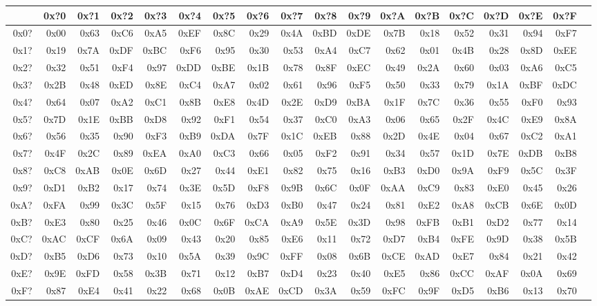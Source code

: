 \begin{table}[h]
{\ttfamily
\begin{tabular}{|r||r|r|r|r|r|r|r|r|r|r|r|r|r|r|r|r|r|}
\hline
 & 0x?0 & 0x?1 & 0x?2 & 0x?3 & 0x?4 & 0x?5 & 0x?6 & 0x?7 & 0x?8 & 0x?9 & 0x?A & 0x?B & 0x?C & 0x?D & 0x?E & 0x?F \\
\hline
0x0? & 0x00 & 0x63 & 0xC6 & 0xA5 & 0xEF & 0x8C & 0x29 & 0x4A & 0xBD & 0xDE & 0x7B & 0x18 & 0x52 & 0x31 & 0x94 & 0xF7 \\
0x1? & 0x19 & 0x7A & 0xDF & 0xBC & 0xF6 & 0x95 & 0x30 & 0x53 & 0xA4 & 0xC7 & 0x62 & 0x01 & 0x4B & 0x28 & 0x8D & 0xEE \\
0x2? & 0x32 & 0x51 & 0xF4 & 0x97 & 0xDD & 0xBE & 0x1B & 0x78 & 0x8F & 0xEC & 0x49 & 0x2A & 0x60 & 0x03 & 0xA6 & 0xC5 \\
0x3? & 0x2B & 0x48 & 0xED & 0x8E & 0xC4 & 0xA7 & 0x02 & 0x61 & 0x96 & 0xF5 & 0x50 & 0x33 & 0x79 & 0x1A & 0xBF & 0xDC \\
0x4? & 0x64 & 0x07 & 0xA2 & 0xC1 & 0x8B & 0xE8 & 0x4D & 0x2E & 0xD9 & 0xBA & 0x1F & 0x7C & 0x36 & 0x55 & 0xF0 & 0x93 \\
0x5? & 0x7D & 0x1E & 0xBB & 0xD8 & 0x92 & 0xF1 & 0x54 & 0x37 & 0xC0 & 0xA3 & 0x06 & 0x65 & 0x2F & 0x4C & 0xE9 & 0x8A \\
0x6? & 0x56 & 0x35 & 0x90 & 0xF3 & 0xB9 & 0xDA & 0x7F & 0x1C & 0xEB & 0x88 & 0x2D & 0x4E & 0x04 & 0x67 & 0xC2 & 0xA1 \\
0x7? & 0x4F & 0x2C & 0x89 & 0xEA & 0xA0 & 0xC3 & 0x66 & 0x05 & 0xF2 & 0x91 & 0x34 & 0x57 & 0x1D & 0x7E & 0xDB & 0xB8 \\
0x8? & 0xC8 & 0xAB & 0x0E & 0x6D & 0x27 & 0x44 & 0xE1 & 0x82 & 0x75 & 0x16 & 0xB3 & 0xD0 & 0x9A & 0xF9 & 0x5C & 0x3F \\
0x9? & 0xD1 & 0xB2 & 0x17 & 0x74 & 0x3E & 0x5D & 0xF8 & 0x9B & 0x6C & 0x0F & 0xAA & 0xC9 & 0x83 & 0xE0 & 0x45 & 0x26 \\
0xA? & 0xFA & 0x99 & 0x3C & 0x5F & 0x15 & 0x76 & 0xD3 & 0xB0 & 0x47 & 0x24 & 0x81 & 0xE2 & 0xA8 & 0xCB & 0x6E & 0x0D \\
0xB? & 0xE3 & 0x80 & 0x25 & 0x46 & 0x0C & 0x6F & 0xCA & 0xA9 & 0x5E & 0x3D & 0x98 & 0xFB & 0xB1 & 0xD2 & 0x77 & 0x14 \\
0xC? & 0xAC & 0xCF & 0x6A & 0x09 & 0x43 & 0x20 & 0x85 & 0xE6 & 0x11 & 0x72 & 0xD7 & 0xB4 & 0xFE & 0x9D & 0x38 & 0x5B \\
0xD? & 0xB5 & 0xD6 & 0x73 & 0x10 & 0x5A & 0x39 & 0x9C & 0xFF & 0x08 & 0x6B & 0xCE & 0xAD & 0xE7 & 0x84 & 0x21 & 0x42 \\
0xE? & 0x9E & 0xFD & 0x58 & 0x3B & 0x71 & 0x12 & 0xB7 & 0xD4 & 0x23 & 0x40 & 0xE5 & 0x86 & 0xCC & 0xAF & 0x0A & 0x69 \\
0xF? & 0x87 & 0xE4 & 0x41 & 0x22 & 0x68 & 0x0B & 0xAE & 0xCD & 0x3A & 0x59 & 0xFC & 0x9F & 0xD5 & 0xB6 & 0x13 & 0x70 \\
\hline
\end{tabular}
}
\end{table}

